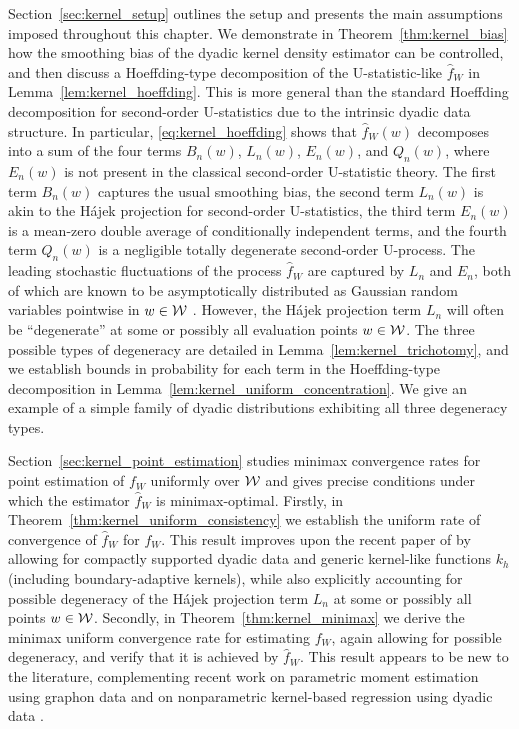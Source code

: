 Section~\ref{sec:kernel_setup} outlines the setup and presents the main
assumptions imposed throughout this chapter. We demonstrate in
Theorem~\ref{thm:kernel_bias} how the smoothing bias of the dyadic kernel
density estimator can be controlled, and then discuss a Hoeffding-type
decomposition of the U-statistic-like $\hat{f}_W$
in Lemma~\ref{lem:kernel_hoeffding}. This is more general than
the standard Hoeffding decomposition for second-order U-statistics due to the
intrinsic dyadic data structure. In particular, \eqref{eq:kernel_hoeffding}
shows that $\hat{f}_W(w)$ decomposes into a sum of the four terms $B_n(w)$,
$L_n(w)$, $E_n(w)$, and $Q_n(w)$, where $E_n(w)$ is not present in the classical
second-order U-statistic theory. The first term $B_n(w)$ captures the usual
smoothing bias, the second term $L_n(w)$ is akin to the H{\'a}jek projection
for second-order U-statistics, the third term $E_n(w)$ is a mean-zero double
average of conditionally independent terms, and the fourth term $Q_n(w)$ is a
negligible totally degenerate second-order U-process. The leading stochastic
fluctuations of the process $\hat{f}_W$ are captured by $L_n$ and $E_n$, both
of which are known to be asymptotically distributed as Gaussian random
variables pointwise in $w\in\mathcal{W}$ \citep{graham2024kernel}. However, the
H{\'a}jek projection term $L_n$ will often be ``degenerate'' at some or
possibly all evaluation points $w\in\mathcal{W}$.
The three possible types of degeneracy are detailed in
Lemma~\ref{lem:kernel_trichotomy},
and we establish bounds in probability for each term in the Hoeffding-type
decomposition in Lemma~\ref{lem:kernel_uniform_concentration}.
We give an example of a simple family of dyadic distributions
exhibiting all three degeneracy types.

Section~\ref{sec:kernel_point_estimation} studies minimax convergence rates for
point
estimation of $f_W$ uniformly over $\mathcal{W}$ and gives precise conditions under
which the estimator $\hat{f}_W$ is minimax-optimal. Firstly, in
Theorem~\ref{thm:kernel_uniform_consistency} we establish the uniform rate of
convergence of $\hat{f}_W$ for $f_W$. This result improves upon the recent
paper of \citet{chiang2020empirical} by allowing for compactly supported dyadic
data and generic kernel-like functions $k_h$ (including boundary-adaptive
kernels), while also explicitly accounting for possible degeneracy of the
H\'{a}jek projection term $L_n$ at some or possibly all points $w\in\mathcal{W}$.
Secondly, in Theorem~\ref{thm:kernel_minimax} we derive the minimax uniform
convergence rate for estimating $f_W$, again allowing for possible degeneracy,
and verify that it is achieved by $\hat f_W$. This result appears to be new to
the literature, complementing recent work on parametric moment estimation using
graphon data \citep{gao2021minimax} and on nonparametric kernel-based
regression using dyadic data \citep{graham2021minimax}.

